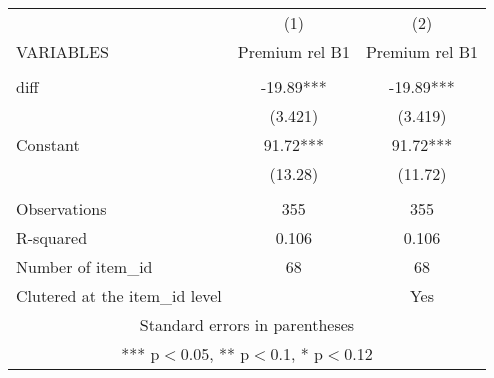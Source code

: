 \documentclass[]{article}
\begin{document}
\begin{tabular}{lcc} \hline
 & (1) & (2) \\
VARIABLES & Premium rel B1 & Premium rel B1 \\ \hline
 &  &  \\
diff & -19.89*** & -19.89*** \\
 & (3.421) & (3.419) \\
Constant & 91.72*** & 91.72*** \\
 & (13.28) & (11.72) \\
 &  &  \\
Observations & 355 & 355 \\
R-squared & 0.106 & 0.106 \\
Number of item\_id & 68 & 68 \\
 Clutered at the item\_id level &  & Yes \\ \hline
\multicolumn{3}{c}{ Standard errors in parentheses} \\
\multicolumn{3}{c}{ *** p$<$0.05, ** p$<$0.1, * p$<$0.12} \\
\end{tabular}
\end{document}
